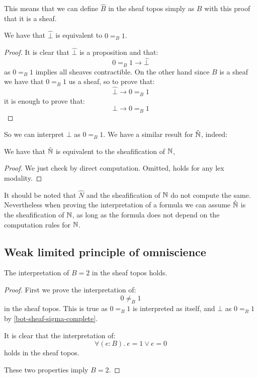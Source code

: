 This means that we can define $\hat{B}$ in the sheaf topos simply as $B$ with this proof that it is a sheaf.

\begin{lemma}\label{bot-sheaf-sigma-complete}
We have that $\hat{\bot}$ is equivalent to $0=_B1$.
\end{lemma}

\begin{proof}
It is clear that $\hat{\bot}$ is a proposition and that:
\[0=_B1 \to \hat{\bot}\]
as $0=_B1$ implies all sheaves contractible. On the other hand since $B$ is a sheaf we have that $0=_B 1$ us a sheaf, so to prove that:
\[\hat{\bot}\to 0=_B1\]
it is enough to prove that:
\[\bot\to 0=_B1\]
\end{proof}

So we can interpret $\bot$ as $0=_B1$. We have a similar result for $\hat{\mathbb{N}}$, indeed:

\begin{lemma}\label{N-sheafification-sigma-complete}
We have that $\hat{\mathbb{N}}$ is equivalent to the sheafification of $\mathbb{N}$,
\end{lemma}

\begin{proof}
We just check by direct computation. Omitted, holds for any lex modality.
\end{proof}

It should be noted that $\hat{N}$ and the sheafification of $\mathbb{N}$ do not compute the same. Nevertheless when proving the interpretation of a formula we can assume $\hat{\mathbb{N}}$ is the sheafification of $\mathbb{N}$, as long as the formula does not depend on the computation rules for $\mathbb{N}$.


\subsection{Weak limited principle of omniscience}

\begin{lemma}\label{B-is-2-sigma-complete}
The interpretation of $B=2$ in the sheaf topos holds.
\end{lemma}

\begin{proof}
First we prove the interpretation of:
\[0\not=_B1\] 
in the sheaf topos. This is true as $0=_B1$ is interpreted as itself, and $\bot$ as $0=_B1$ by \cref{bot-sheaf-sigma-complete}.

It is clear that the interpretation of:
\[\forall(e:B).\ e=1 \lor e=0\]
holds in the sheaf topos.

These two properties imply $B=2$. 
\end{proof}

